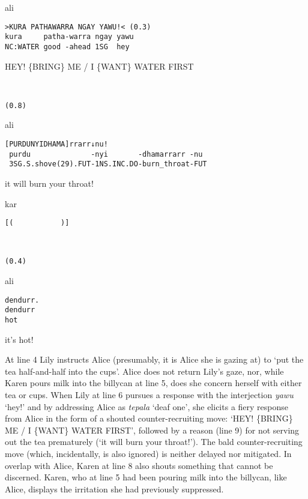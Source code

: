 \documentclass[output=paper,nonflat,colorlinks,citecolor=brown]{langsci/langscibook}
\begin{document}
%
\begin{mdframednoverticalspace}[style=thirdfoc]
\begin{transbox}{7}{ali} %
\begin{verbatim}
>KURA PATHAWARRA NGAY YAWU!< (0.3)
kura     patha-warra ngay yawu
NC:WATER good -ahead 1SG  hey
\end{verbatim}
HEY! \{BRING\} ME / I \{WANT\} WATER FIRST
\end{transbox}
\end{mdframednoverticalspace}
%
\begin{transbox}{8}{~}
\begin{verbatim}
(0.8)
\end{verbatim}
\end{transbox}
%
\begin{transbox}{9}{ali}
\begin{verbatim}
[PURDUNYIDHAMA]rrarr↓nu!
 purdu              -nyi       -dhamarrarr -nu
 3SG.S.shove(29).FUT-1NS.INC.DO-burn_throat-FUT
\end{verbatim}
\hspace{0.07cm} it will burn your throat!
\end{transbox}
%
\begin{transbox}{10}{kar}
\begin{verbatim}
[(           )]
\end{verbatim}
\end{transbox}
%
\begin{transbox}{11}{~}
\begin{verbatim}
(0.4)
\end{verbatim}
\end{transbox}\vspace{-1mm}
%
\begin{transbox}{12}{ali}
\begin{verbatim}
dendurr.
dendurr
hot
\end{verbatim}
it’s hot!
\end{transbox}\bigskip

At line 4 Lily instructs Alice (presumably, it is Alice she is gazing at) to ‘put the tea half-and-half into the cups’. Alice does not return Lily’s gaze, nor, while Karen pours milk into the billycan at line 5, does she concern herself with either tea or cups. When Lily at line 6 pursues a response with the interjection \textit{yawu} ‘hey!’ and by addressing Alice as \textit{tepala} ‘deaf one’, she elicits a fiery response from Alice in the form of a shouted counter-recruiting move: ‘HEY! \{BRING\} ME / I \{WANT\} WATER FIRST’, followed by a reason (line 9) for not serving out the tea prematurely (‘it will burn your throat!’). The bald counter-recruiting move (which, incidentally, is also ignored) is neither delayed nor mitigated. In overlap with Alice, Karen at line 8 also shouts something that cannot be discerned. Karen, who at line 5 had been pouring milk into the billycan, like Alice, displays the irritation she had previously suppressed.
\end{document}
